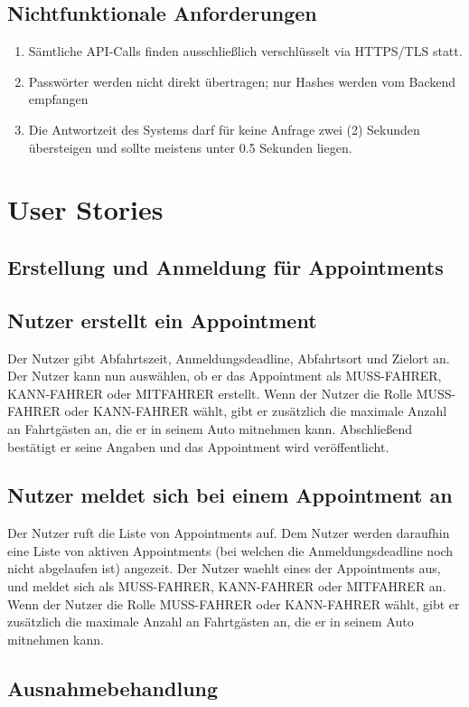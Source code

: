 \documentclass[11pt,a4paper]{article}
\begin{document}
\subsection{Nichtfunktionale Anforderungen}
\begin{enumerate}
\item Sämtliche API-Calls finden ausschließlich verschlüsselt via HTTPS/TLS statt.
\item Passwörter werden nicht direkt übertragen; nur Hashes werden vom Backend empfangen
\item Die Antwortzeit des Systems darf für keine Anfrage zwei (2) Sekunden übersteigen und sollte meistens unter 0.5 Sekunden liegen.
\end{enumerate}


\section{User Stories}
\subsection{Erstellung und Anmeldung für Appointments}
\subsection*{Nutzer erstellt ein Appointment}
Der Nutzer gibt Abfahrtszeit, Anmeldungsdeadline, Abfahrtsort und Zielort an. Der Nutzer kann nun auswählen, ob er das Appointment als MUSS-FAHRER, KANN-FAHRER oder MITFAHRER erstellt. Wenn der Nutzer die Rolle MUSS-FAHRER oder KANN-FAHRER wählt, gibt er zusätzlich die maximale Anzahl an Fahrtgästen an, die er in seinem Auto mitnehmen kann. Abschließend bestätigt er seine Angaben und das Appointment wird veröffentlicht.

\subsection*{Nutzer meldet sich bei einem Appointment an}
Der Nutzer ruft die Liste von Appointments auf. Dem Nutzer werden daraufhin eine Liste von aktiven Appointments (bei welchen die Anmeldungsdeadline noch nicht abgelaufen ist) angezeit. Der Nutzer waehlt eines der Appointments aus, und meldet sich als MUSS-FAHRER, KANN-FAHRER oder MITFAHRER an. Wenn der Nutzer die Rolle MUSS-FAHRER oder KANN-FAHRER wählt, gibt er zusätzlich die maximale Anzahl an Fahrtgästen an, die er in seinem Auto mitnehmen kann.

\subsection{Ausnahmebehandlung}
\end{document}
